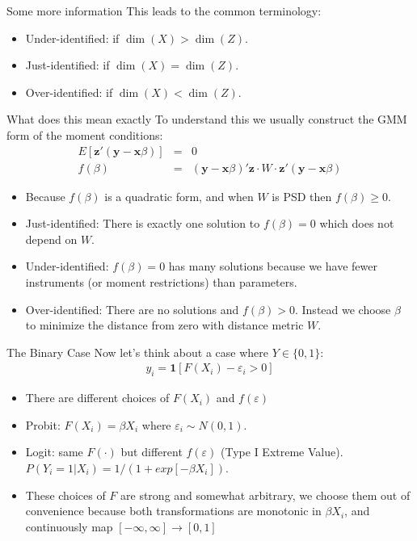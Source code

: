 \documentclass[11pt,handout,xcolor=pdftex,dvipsnames,table,mathserif]{beamer}
\begin{document}
\begin{frame}{Some more information}
This leads to the common terminology:
\begin{itemize}
\item Under-identified: if $\dim(X) > \dim(Z)$.
\item Just-identified: if $\dim(X) = \dim(Z)$.
\item Over-identified: if $\dim(X) < \dim(Z)$.
\end{itemize}
\end{frame}

\begin{frame}{What does this mean exactly}
To understand this we usually construct the GMM form of the moment conditions:
\begin{eqnarray*}
E[\mathbf{z}' (\mathbf{y} - \mathbf{x} \beta)] &=&0\\
f(\beta)&=&  (\mathbf{y} - \mathbf{x} \beta)' \mathbf{z} \cdot W \cdot \mathbf{z}' (\mathbf{y} - \mathbf{x} \beta)
\end{eqnarray*}
\begin{itemize}
\item Because $f(\beta)$ is a quadratic form, and when $W$ is PSD then $f(\beta) \geq 0$.
\item Just-identified: There is exactly one solution to $f(\beta) = 0$ which does not depend on $W$.
\item Under-identified: $f(\beta) = 0$ has many solutions because we have fewer instruments (or moment restrictions) than parameters.
\item Over-identified: There are no solutions and $f(\beta) > 0$. Instead we choose $\beta$ to minimize the distance from zero with distance metric $W$.
\end{itemize}
\end{frame}

\begin{frame}{The Binary Case}
Now let's think about a case where $Y \in \{0,1\}$:
\begin{eqnarray*}
y_i = \mathbf{1}[F(X_i) - \varepsilon_i > 0]
\end{eqnarray*}
\begin{itemize}
\item There are different choices of $F(X_i)$ and $f(\varepsilon)$
\item  Probit: $F(X_i) = \beta X_i$ where $\varepsilon_i \sim N(0,1)$.
\item  Logit: same $F(\cdot)$ but different $f(\varepsilon)$ (Type I Extreme Value). $P(Y_i = 1 | X_i) = 1/(1+exp[-\beta X_i])$.
\item These choices of $F$ are strong and somewhat arbitrary, we choose them out of convenience because both transformations are monotonic in $\beta X_i$, and continuously map $[-\infty,\infty] \rightarrow [0,1]$
\end{itemize}
\end{frame}
\end{document}
